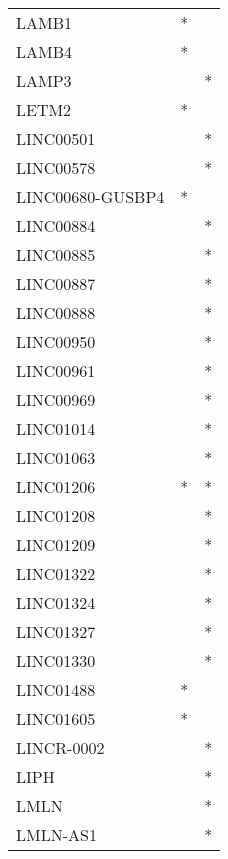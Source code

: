 \begin{longtable}{lcc}
LAMB1            &              * &            \\
LAMB4            &              * &            \\
LAMP3            &                &          * \\
LETM2            &              * &            \\
LINC00501        &                &          * \\
LINC00578        &                &          * \\
LINC00680-GUSBP4 &              * &            \\
LINC00884        &                &          * \\
LINC00885        &                &          * \\
LINC00887        &                &          * \\
LINC00888        &                &          * \\
LINC00950        &                &          * \\
LINC00961        &                &          * \\
LINC00969        &                &          * \\
LINC01014        &                &          * \\
LINC01063        &                &          * \\
LINC01206        &              * &          * \\
LINC01208        &                &          * \\
LINC01209        &                &          * \\
LINC01322        &                &          * \\
LINC01324        &                &          * \\
LINC01327        &                &          * \\
LINC01330        &                &          * \\
LINC01488        &              * &            \\
LINC01605        &              * &            \\
LINCR-0002       &                &          * \\
LIPH             &                &          * \\
LMLN             &                &          * \\
LMLN-AS1         &                &          * \\

\end{longtable}
